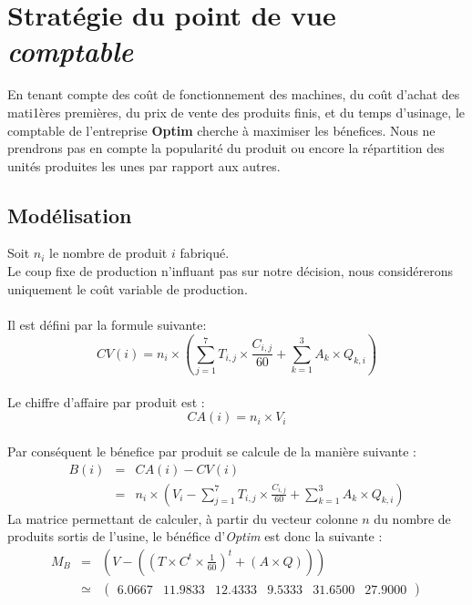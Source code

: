 \section{Stratégie du point de vue \textsl{comptable}}
\label{sec:comptable}
En tenant compte des coût de fonctionnement des machines, du coût d'achat des mati1ères premières,
du prix de vente des produits finis, et du temps d'usinage, le comptable de l'entreprise \textbf{Optim} cherche 
à maximiser les bénefices. Nous ne prendrons pas en compte la \og popularité \fg du produit ou encore
la répartition des unités produites les unes par rapport aux autres.

\subsection{Modélisation}
Soit $n_i$ le nombre de produit $i$ fabriqué.\\
Le coup fixe de production n'influant pas sur notre décision, nous considérerons uniquement le coût variable de
production.\\
~\\
Il est défini par la formule suivante:
\begin{displaymath}
	CV(i) = n_i \times \left (\sum_{j = 1}^{7} T_{i,j} \times 
	\frac{C_{i,j}}{60} + \sum_{k = 1}^{3} A_{k} \times Q_{k,i} \right )
\end{displaymath}
~\\
Le chiffre d'affaire par produit est :
\begin{displaymath}
	CA(i) = n_i \times V_i
\end{displaymath}
~\\
Par conséquent le bénefice par produit se calcule de la manière suivante :
\begin{eqnarray*}
	B(i)	&=& CA(i) - CV(i)\\
			&=& n_i  \times \left (V_i - \sum_{j = 1}^{7} T_{i,j} \times \frac{C_{i,j}}{60} +
	\sum_{k = 1}^{3} A_{k} \times Q_{k,i} \right )
\end{eqnarray*}
La matrice permettant de calculer, à partir du vecteur colonne $n$ du nombre de produits sortis de l'usine, le bénéfice
d'\emph{Optim} est donc la suivante :
\begin{eqnarray*}
	M_{B} &=&  \left(V - \left( \left(T \times C^{t} \times \frac{1}{60} \right)^{t} + \left(A \times Q\right) \right)\right) \\
		&\simeq& \begin{pmatrix} 6.0667 & 11.9833 & 12.4333 & 9.5333 & 31.6500 & 27.9000 \end{pmatrix}
\end{eqnarray*}

